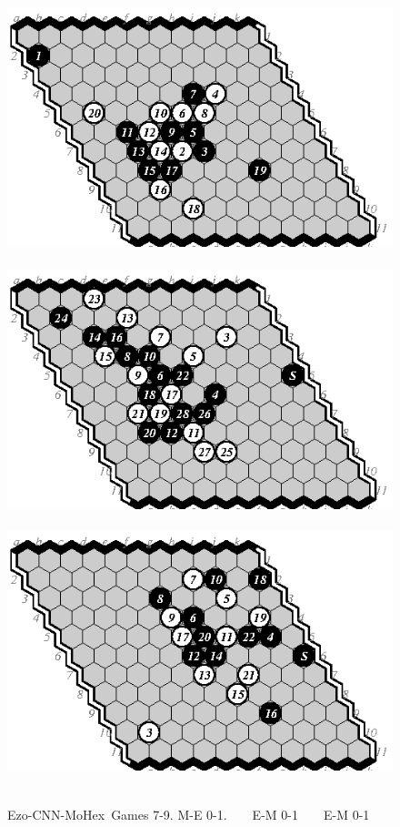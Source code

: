 \documentclass{icga}
\def\Ec{\mbox{\sc Ezo-CNN}}
\def\Mx{\mbox{\sc MoHex}}
\begin{document}
\begin{figure}[hbp]
\includegraphics[scale=1]{pix/11.me7.eps}\hspace*{-1.2cm}\
\includegraphics[scale=1]{pix/11.em8.eps}\hspace*{-1.2cm}\
\includegraphics[scale=1]{pix/11.em9.eps}\hspace*{-1.2cm}\
\caption{\Ec-\Mx\ Games 7-9. M-E 0-1. ~ ~ E-M 0-1 ~ ~ E-M 0-1}
\end{figure}
\end{document}
